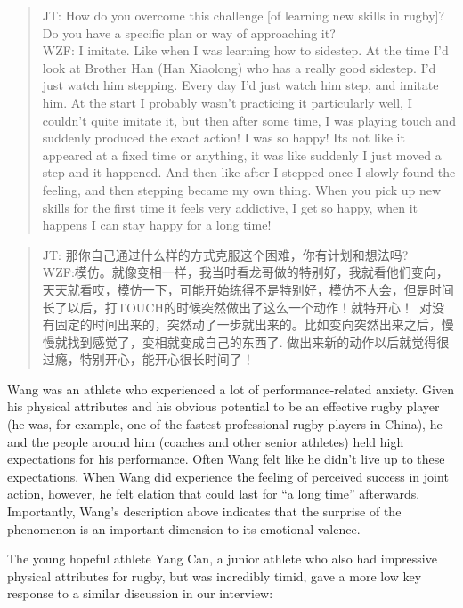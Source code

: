 \begin{CJK}{UTF8}{gbsn}
    \begin{quote}
      JT: How do you overcome this challenge [of learning new skills in rugby]? Do you have a specific plan or way of approaching it? \\
      WZF: I imitate.  Like when I was learning how to sidestep. At the time I’d look at Brother Han (Han Xiaolong) who has a really good sidestep. I'd just watch him stepping.  Every day I'd just watch him step, and imitate him.  At the start I probably wasn't practicing it particularly well, I couldn't quite imitate it, but then after some time, I was playing touch and suddenly produced the exact action! I was so happy! Its not like it appeared at a fixed time or anything, it was like suddenly I just moved a step and it happened. And then like after I stepped once I slowly found the feeling, and then stepping became my own thing.  When you pick up new skills for the first time it feels very addictive, I get so happy, when it happens I can stay happy for a long time!
    \end{quote}

    \begin{quote}
      JT: 那你自己通过什么样的方式克服这个困难，你有计划和想法吗? \\
      WZF:模仿。就像变相一样，我当时看龙哥做的特别好，我就看他们变向，天天就看哎，模仿一下，可能开始练得不是特别好，模仿不大会，但是时间长了以后，打TOUCH的时候突然做出了这么一个动作！就特开心！ 对没有固定的时间出来的，突然动了一步就出来的。比如变向突然出来之后，慢慢就找到感觉了，变相就变成自己的东西了. 做出来新的动作以后就觉得很过瘾，特别开心，能开心很长时间了！
    \end{quote}

Wang was an athlete who experienced a lot of performance-related anxiety.  Given his physical attributes and his obvious potential to be an effective rugby player (he was, for example, one of the fastest professional rugby players in China), he and the people around him (coaches and other senior athletes) held high expectations for his performance.  Often Wang felt like he didn't live up to these expectations.  When Wang did experience the feeling of perceived success in joint action, however, he felt elation that could last for ``a long time'' afterwards.  Importantly, Wang's description above indicates that the surprise of the phenomenon is an important dimension to its emotional valence.

The young hopeful athlete Yang Can, a junior athlete who also had impressive physical attributes for rugby, but was incredibly timid, gave a more low key response to a similar discussion in our interview:


\end{CJK}
